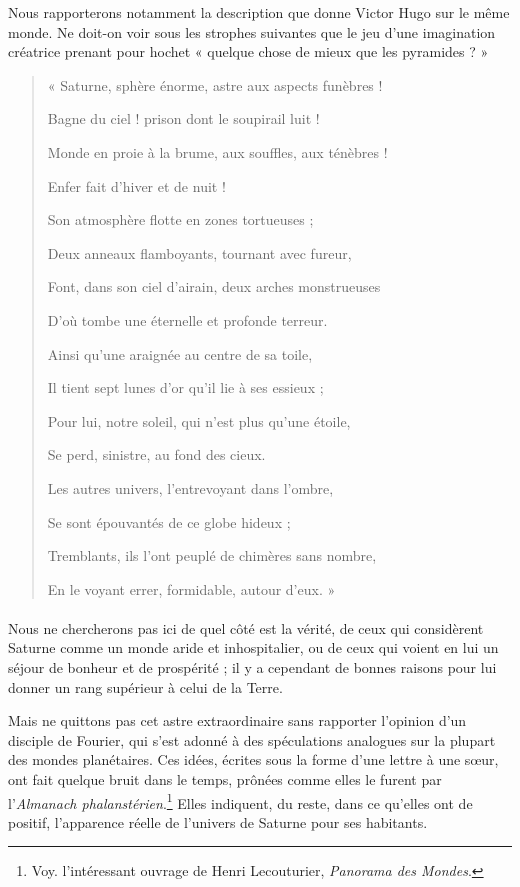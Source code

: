 \documentclass[a4paper, 11pt, oneside]{article}
\begin{document}
Nous rapporterons notamment la description que donne Victor Hugo sur le même monde. Ne doit-on voir sous les strophes suivantes que le jeu d'une imagination créatrice prenant pour hochet « quelque chose de mieux que les pyramides ? »
\begin{quotation}
\normalsize
« Saturne, sphère énorme, astre aux aspects funèbres !

Bagne du ciel ! prison dont le soupirail luit !

Monde en proie à la brume, aux souffles, aux ténèbres !

\hspace*{5mm}Enfer fait d'hiver et de nuit !

\bigskip

Son atmosphère flotte en zones tortueuses ;

Deux anneaux flamboyants, tournant avec fureur,

Font, dans son ciel d'airain, deux arches monstrueuses

D'où tombe une éternelle et profonde terreur.

\bigskip

Ainsi qu'une araignée au centre de sa toile,

Il tient sept lunes d'or qu'il lie à ses essieux ;

Pour lui, notre soleil, qui n'est plus qu'une étoile,

\hspace*{5mm}Se perd, sinistre, au fond des cieux.

\bigskip

Les autres univers, l'entrevoyant dans l'ombre,

Se sont épouvantés de ce globe hideux ;

Tremblants, ils l'ont peuplé de chimères sans nombre,

En le voyant errer, formidable, autour d'eux. »
\end{quotation}
\paragraph{}
Nous ne chercherons pas ici de quel côté est la vérité, de ceux qui considèrent Saturne comme un monde aride et inhospitalier, ou de ceux qui voient en lui un séjour de bonheur et de prospérité ; il y a cependant de bonnes raisons pour lui donner un rang supérieur à celui de la Terre.

Mais ne quittons pas cet astre extraordinaire sans rapporter l'opinion d'un disciple de Fourier, qui s'est adonné à des spéculations analogues sur la plupart des mondes planétaires. Ces idées, écrites sous la forme d'une lettre à une sœur, ont fait quelque bruit dans le temps, prônées comme elles le furent par l'\emph{Almanach phalanstérien}.\footnote{Voy. l'intéressant ouvrage de Henri Lecouturier, \emph{Panorama des Mondes}.} Elles indiquent, du reste, dans ce qu'elles ont de positif, l'apparence réelle de l'univers de Saturne pour ses habitants.
\end{document}
